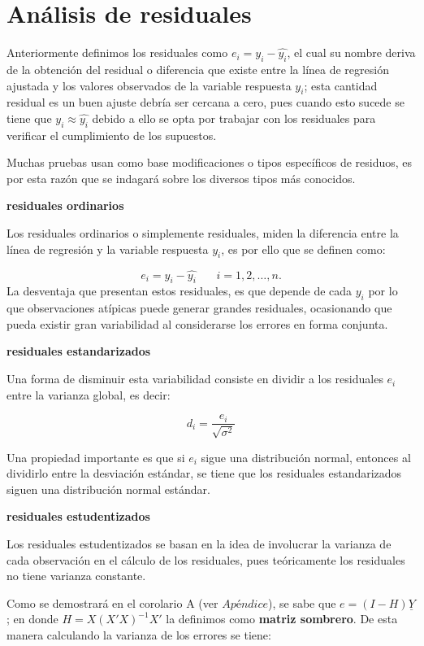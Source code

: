 \documentclass[
  a4paper,
  oneside,
  openany]{book}
\begin{document}
\hypertarget{anuxe1lisis-de-residuales}{%
\section{Análisis de residuales}\label{anuxe1lisis-de-residuales}}

Anteriormente definimos los residuales como \(e_{i}=y_{i}-\hat{y_{i}}\), el cual su nombre deriva de la obtención del residual o diferencia que existe entre la línea de regresión ajustada y los valores observados de la variable respuesta \(y_{i}\); esta cantidad residual es un buen ajuste debría ser cercana a cero, pues cuando esto sucede se tiene que \(y_{i} \approx \hat{y_{i}}\) debido a ello se opta por trabajar con los residuales para verificar el cumplimiento de los supuestos.

Muchas pruebas usan como base modificaciones o tipos específicos de residuos, es por esta razón que se indagará sobre los diversos tipos más conocidos.

\textbf{residuales ordinarios}

Los residuales ordinarios o simplemente residuales, miden la diferencia entre la línea de regresión y la variable respuesta \(y_{i}\), es por ello que se definen como:

\[e_{i}=y_{i}-\hat{y_{i}}  \ \ \ \ \ \ \ \ i=1,2,\ldots ,n.\]
La desventaja que presentan estos residuales, es que depende de cada \(y_{i}\) por lo que observaciones atípicas puede generar grandes residuales, ocasionando que pueda existir gran variabilidad al considerarse los errores en forma conjunta.

\textbf{residuales estandarizados}

Una forma de disminuir esta variabilidad consiste en dividir a los residuales \(e_{i}\) entre la varianza global, es decir:

\[d_{i}=\frac{e_{i}}{\sqrt{\sigma^2}}\]

Una propiedad importante es que si \(e_{i}\) sigue una distribución normal, entonces al dividirlo entre la desviación estándar, se tiene que los residuales estandarizados siguen una distribución normal estándar.

\textbf{residuales estudentizados}

Los residuales estudentizados se basan en la idea de involucrar la varianza de cada observación en el cálculo de los residuales, pues teóricamente los residuales no tiene varianza constante.

Como se demostrará en el corolario A (ver \(Apéndice\)), se sabe que \(e=(I-H)\underline{Y}\); en donde \(H=X(X'X)^{-1}X'\) la definimos como \textbf{matriz sombrero}.
De esta manera calculando la varianza de los errores se tiene:
\end{document}
